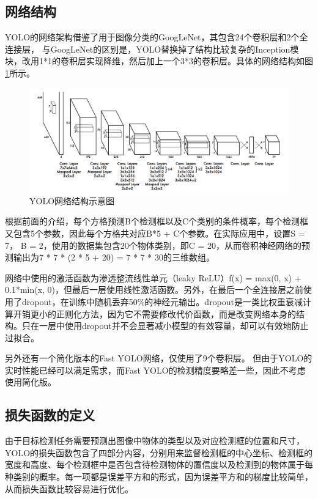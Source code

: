 \subsection{网络结构}
YOLO的网络架构借鉴了用于图像分类的GoogLeNet\cite{szegedy2015going}，其包含24个卷积层和2个全连接层，
与GoogLeNet的区别是，YOLO替换掉了结构比较复杂的Inception模块，改用1*1的卷积层实现降维，然后加上一个3*3的卷积层。具体的网络结构如图\ref{fig:3_2_YOLO网络结构}所示。

\begin{figure}[htb] %
	\centering
	\includegraphics[width=5in]{figures/3_2_YOLO网络结构}
	\caption{YOLO网络结构示意图} \label{fig:3_2_YOLO网络结构}
\end{figure}

根据前面的介绍，每个方格预测B个检测框以及C个类别的条件概率，每个检测框又包含5个参数，因此每个方格共对应B*5 + C个参数。在实际应用中，设置S = 7， B = 2，使用的数据集包含20个物体类别，即C = 20，从而卷积神经网络的预测输出为7 * 7 * (2 * 5 + 20) = 7 * 7 * 30的三维数组。

网络中使用的激活函数为渗透整流线性单元（leaky ReLU）f(x) = max(0, x) + 0.1*min(x, 0)，但最后一层使用线性激活函数。另外，在最后一个全连接层之前使用了dropout\cite{hinton2012improving}，在训练中随机丢弃50\%的神经元输出。dropout是一类比权重衰减计算开销更小的正则化方法，因为它不需要修改代价函数，而是改变网络本身的结构。只在一层中使用dropout并不会显著减小模型的有效容量，却可以有效地防止过拟合。

另外还有一个简化版本的Fast YOLO网络，仅使用了9个卷积层。 但由于YOLO的实时性能已经可以满足需求，而Fast YOLO的检测精度要略差一些，因此不考虑使用简化版。


\subsection{损失函数的定义} %
由于目标检测任务需要预测出图像中物体的类型以及对应检测框的位置和尺寸，YOLO的损失函数包含了四部分内容，分别用来监督检测框的中心坐标、检测框的宽度和高度、每个检测框中是否包含待检测物体的置信度以及检测到的物体属于每种类别的概率。每一项都是误差平方和的形式，因为误差平方和的梯度比较简单，从而损失函数比较容易进行优化。

